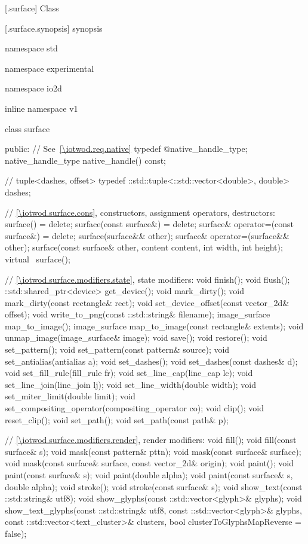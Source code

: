  [\iotwod.surface] {Class }

 [\iotwod.surface.synopsis] { synopsis}

\begin{codeblock}
namespace std { namespace experimental { namespace io2d { inline namespace v1 {
  class surface {
  public:
    // See~\ref{\iotwod.req.native}
    typedef @\impdef@ native_handle_type;
    native_handle_type native_handle() const;

    // tuple<dashes, offset>
    typedef ::std::tuple<::std::vector<double>, double> dashes;

    // \ref{\iotwod.surface.cons}, constructors, assignment operators, destructors:
    surface() = delete;
    surface(const surface&) = delete;
    surface& operator=(const surface&) = delete;
    surface(surface&& other);
    surface& operator=(surface&& other);
    surface(const surface& other, content content, int width, int height);
    virtual ~surface();

    // \ref{\iotwod.surface.modifiers.state}, state modifiers:
    void finish();
    void flush();
    ::std::shared_ptr<device> get_device();
    void mark_dirty();
    void mark_dirty(const rectangle& rect);
    void set_device_offset(const vector_2d& offset);
    void write_to_png(const ::std::string& filename);
    image_surface map_to_image();
    image_surface map_to_image(const rectangle& extents);
    void unmap_image(image_surface& image);
    void save();
    void restore();
    void set_pattern();
    void set_pattern(const pattern& source);
    void set_antialias(antialias a);
    void set_dashes();
    void set_dashes(const dashes& d);
    void set_fill_rule(fill_rule fr);
    void set_line_cap(line_cap lc);
    void set_line_join(line_join lj);
    void set_line_width(double width);
    void set_miter_limit(double limit);
    void set_compositing_operator(compositing_operator co);
    void clip();
    void reset_clip();
    void set_path();
    void set_path(const path& p);

    // \ref{\iotwod.surface.modifiers.render}, render modifiers:
    void fill();
    void fill(const surface& s);
    void mask(const pattern& pttn);
    void mask(const surface& surface);
    void mask(const surface& surface, const vector_2d& origin);
    void paint();
    void paint(const surface& s);
    void paint(double alpha);
    void paint(const surface& s, double alpha);
    void stroke();
    void stroke(const surface& s);
    void show_text(const ::std::string& utf8);
    void show_glyphs(const ::std::vector<glyph>& glyphs);
    void show_text_glyphs(const ::std::string& utf8,
      const ::std::vector<glyph>& glyphs,
      const ::std::vector<text_cluster>& clusters, 
      bool clusterToGlyphsMapReverse = false);

}}}}}
\end{codeblock}

